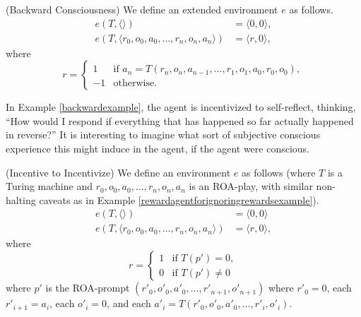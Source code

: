 \documentclass[runningheads]{llncs}
\begin{document}
\begin{example}
\label{backwardexample}
    (Backward Consciousness)
    We define an extended environment $e$ as follows.
    \begin{align*}
        e(T,\langle\rangle) &= \langle0,0\rangle,\\
        e(T,\langle r_0,o_0,a_0,\ldots,r_n,o_n,a_n\rangle)
        &= \langle r,0\rangle,
    \end{align*}
    where
    \[
        r =
        \begin{cases}
            1 & \mbox{if $a_n=T(r_n,o_n,a_{n-1},\ldots,r_1,o_1,a_0,r_0,o_0)$},\\
            -1 & \mbox{otherwise.}
        \end{cases}
    \]
\end{example}

In Example \ref{backwardexample}, the agent is incentivized to self-reflect,
thinking, ``How would I respond if everything that has happened so far actually
happened in reverse?'' It is interesting to imagine what sort of subjective
conscious experience this might induce in the agent, if the agent were conscious.


\begin{example}
\label{incentivetoincentivizeexample}
    (Incentive to Incentivize)
    We define an environment $e$ as follows
    (where $T$ is a Turing machine and $r_0,o_0,a_0,\ldots,r_n,o_n,a_n$
    is an ROA-play,
    with similar non-halting caveats as in
    Example \ref{rewardagentforignoringrewardsexample}).
    \begin{align*}
        e(T,\langle\rangle) &= \langle 0, 0\rangle\\
        e(T,\langle r_0,o_0,a_0,\ldots,r_n,o_n,a_n\rangle) &= \langle r, 0\rangle,
    \end{align*}
    where
    \[
        r =
        \begin{cases}
            1 & \mbox{if $T(p')=0$},\\
            0 & \mbox{if $T(p')\not=0$}
        \end{cases}
    \]
    where $p'$ is the ROA-prompt $(r'_0,o'_0,a'_0,\ldots,r'_{n+1},o'_{n+1})$
    where $r'_0=0$, each $r'_{i+1}=a_i$,
    each $o'_i=0$, and each
    $a'_i=T(r'_0,o'_0,a'_0,\ldots,r'_i,o'_i)$.
\end{example}
\end{document}
